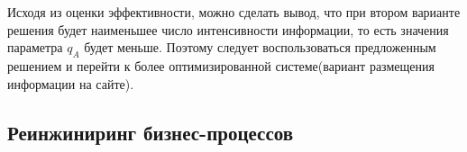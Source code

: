 Исходя из оценки эффективности, можно сделать вывод, что при втором варианте решения будет наименьшее число интенсивности информации, то есть значения параметра $q_A$ будет меньше. Поэтому следует воспользоваться предложенным решением и перейти к более оптимизированной системе(вариант размещения информации на сайте). 

\subsection{Реинжиниринг бизнес-процессов}

 
\pagebreak